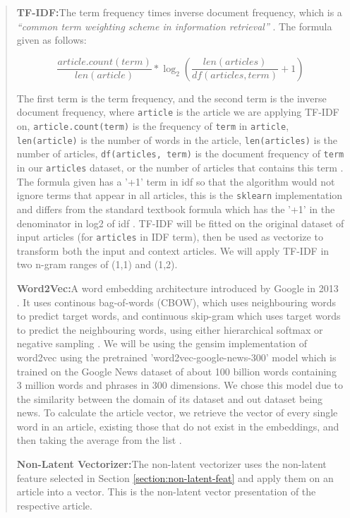 \documentclass{article}
\begin{document}
\begin{quote}
  \textbf{TF-IDF:}\quad The term frequency times inverse document frequency, which is a \emph{``common term weighting scheme in information retrieval''} \cite{scikit-learn}. The formula given as follows:

  \[\frac{article.count(term)}{len(article)} * \log_2{\left(\frac{len(articles)}{df(articles, term)} + 1\right)}\]

  The first term is the term frequency, and the second term is the inverse document frequency, where \texttt{article} is the article we are applying TF-IDF on, \texttt{article.count(term)} is the frequency of \texttt{term} in \texttt{article}, \texttt{len(article)} is the number of words in the article, \texttt{len(articles)} is the number of articles, \texttt{df(articles, term)} is the document frequency of \texttt{term} in our \texttt{articles} dataset, or the number of articles that contains this term  \cite{scikit-learn}. The formula given has a '+1' term in idf so that the algorithm would not ignore terms that appear in all articles, this is the \texttt{sklearn} implementation and differs from the standard textbook formula which has the '+1' in the denominator in log2 of idf  \cite{scikit-learn}. TF-IDF will be fitted on the original dataset of input articles (for \texttt{articles} in IDF term), then be used as vectorize to transform both the input and context articles. We will apply TF-IDF in two n-gram ranges of (1,1) and (1,2).

  \textbf{Word2Vec:}\quad A word embedding architecture introduced by Google in 2013 \cite{word2vec-google}. It uses continous bag-of-words (CBOW), which uses neighbouring words to predict target words, and continuous skip-gram which uses target words to predict the neighbouring words, using either hierarchical softmax or negative sampling \cite{gensim} \cite{mikolov2013efficient}. We will be using the gensim implementation of word2vec using the pretrained 'word2vec-google-news-300' model which is trained on the Google News dataset of about 100 billion words containing 3 million words and phrases in 300 dimensions. We chose this model due to the similarity between the domain of its dataset and out dataset being news. To calculate the article vector, we retrieve the vector of every single word in an article, existing those that do not exist in the embeddings, and then taking the average from the list \cite{alsuliman2022social}.

  \textbf{Non-Latent Vectorizer:}\quad The non-latent vectorizer uses the non-latent feature selected in Section \ref{section:non-latent-feat} and apply them on an article into a vector. This is the non-latent vector presentation of the respective article.
\end{quote}
\end{document}

